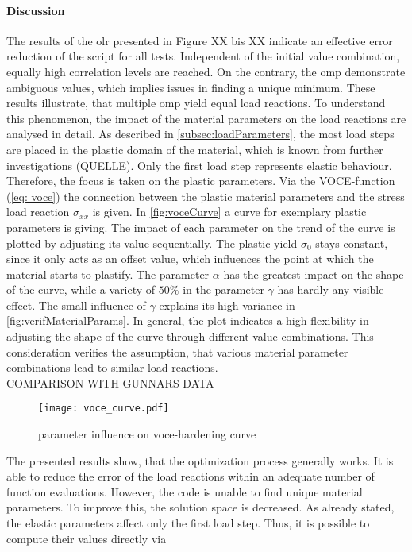 \paragraph{Discussion}
The results of the \acrlong{olr} presented in Figure XX bis XX indicate an effective error reduction of the script for all tests. Independent of the initial value combination, equally high correlation levels are reached. On the contrary, the \acrlong{omp} demonstrate ambiguous values, which implies issues in finding a unique minimum. These results illustrate, that multiple \acrlong{omp} yield equal load reactions. To understand this phenomenon, the impact of the material parameters on the load reactions are analysed in detail. As described in \autoref{subsec:loadParameters}, the most load steps are placed in the plastic domain of the material, which is known from further investigations (QUELLE). Only the first load step represents elastic behaviour. Therefore, the focus is taken on the plastic parameters. Via the VOCE-function (\autoref{eq: voce}) the connection between the plastic material parameters and the stress load reaction $\sigma_{xx}$ is given. In \autoref{fig:voceCurve} a curve for exemplary plastic parameters is giving. The impact of each parameter on the trend of the curve is plotted by adjusting its value sequentially. The plastic yield $\sigma_0$ stays constant, since it only acts as an offset value, which influences the point at which the material starts to plastify. The parameter $\alpha$ has the greatest impact on the shape of the curve, while a variety of \(50\%\) in the parameter $\gamma$ has hardly any visible effect. The small influence of $\gamma$ explains its high variance in \autoref{fig:verifMaterialParams}. In general, the plot indicates a high flexibility in adjusting the shape of the curve through different value combinations. This consideration verifies the assumption, that various material parameter combinations lead to similar load reactions. \\

COMPARISON WITH GUNNARS DATA

\begin{figure}[H]
    \centering
    \texttt{[image: voce\_curve.pdf]}
    \caption{parameter influence on voce-hardening curve}
    \label{fig:voceCurve}
\end{figure}

The presented results show, that the optimization process generally works. It is able to reduce the error of the load reactions within an adequate number of function evaluations. However, the code is unable to find unique material parameters. To improve this, the solution space is decreased. As already stated, the elastic parameters affect only the first load step. Thus, it is possible to compute their values directly via

